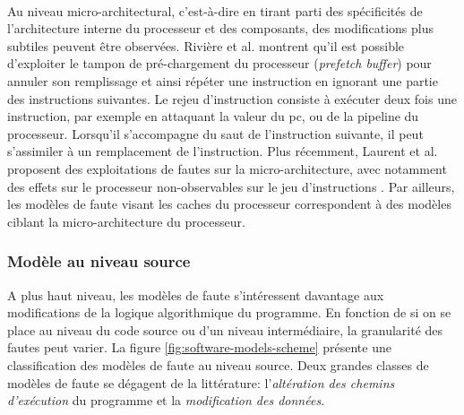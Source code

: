                 \paragraph{}
                Au niveau micro-architectural, c'est-à-dire en tirant parti des spécificités de l'architecture interne du processeur et des composants, des modifications plus subtiles peuvent être observées.
                Rivière et al. \cite{Riviere/HOST15} montrent qu'il est possible d'exploiter le tampon de pré-chargement du processeur (\textit{prefetch buffer}) pour annuler son remplissage et ainsi répéter une instruction en ignorant une partie des instructions suivantes.
                Le rejeu d'instruction \cite{Riviere/FPS14} consiste à exécuter deux fois une instruction, par exemple en attaquant la valeur du \gls{pc}, ou de la pipeline du processeur.
                Lorsqu'il s'accompagne du saut de l'instruction suivante, il peut s'assimiler à un remplacement de l'instruction.
                Plus récemment, Laurent et al. proposent des exploitations de fautes sur la micro-architecture, avec notamment des effets sur le processeur non-observables sur le jeu d'instructions \cite{Laurent/ECDSD19, Laurent/DATE19}.
                Par ailleurs, les modèles de faute visant les caches du processeur correspondent à des modèles ciblant la micro-architecture du processeur.
                
            \subsubsection{Modèle au niveau source}
            \label{sec:model:source}
            
                A plus haut niveau, les modèles de faute s'intéressent davantage aux modifications de la logique algorithmique du programme. En fonction de si on se place au niveau du code source ou d'un niveau intermédiaire, la granularité des fautes peut varier.
                La figure \ref{fig:software-models-scheme} présente une classification des modèles de faute au niveau source.
                Deux grandes classes de modèles de faute se dégagent de la littérature: l'\textit{altération des chemins d'exécution} du programme et la \textit{modification des données}. 
                

